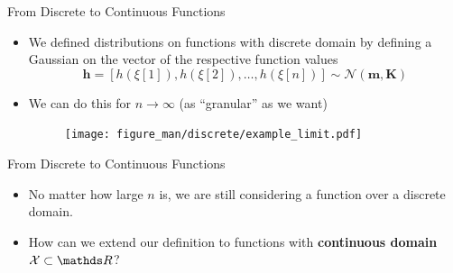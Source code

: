 \begin{vbframe}{From Discrete to Continuous Functions}

\begin{itemize}
  \item We defined distributions on functions with discrete domain by defining a Gaussian on the vector of the respective function values 
  $$
    \mathbf{h} = [h(\xi[1]), h(\xi[2]), \dots, h(\xi[n])] \sim \mathcal{N}(\bm{m}, \bm{K})
  $$

  \item We can do this for $n \to \infty$ (as \enquote{granular} as we want)
  \begin{figure}
    \texttt{[image: figure\_man/discrete/example\_limit.pdf]}
  \end{figure}
\end{itemize}

\end{vbframe}

\begin{frame}{From Discrete to Continuous Functions}


\begin{itemize}
  \item No matter how large $n$ is, we are still considering a function over a discrete domain. 
  \item How can we extend our definition to functions with \textbf{continuous domain} $\Xspace \subset \R$?
\end{itemize}

\end{frame}


